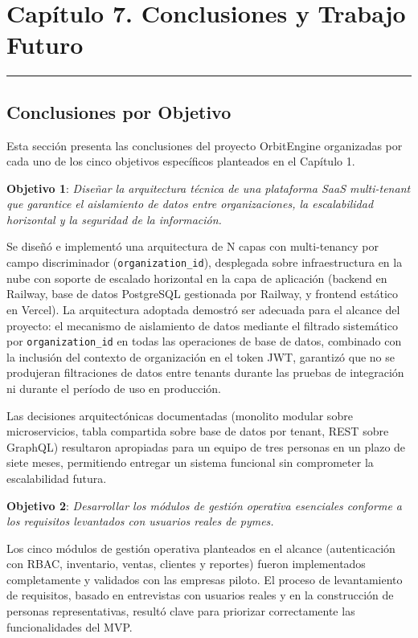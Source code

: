 \chapter{Capítulo 7. Conclusiones y Trabajo Futuro}\label{capuxedtulo-7.-conclusiones-y-trabajo-futuro}

\begin{center}\rule{0.5\linewidth}{0.5pt}\end{center}

\section{Conclusiones por Objetivo}\label{conclusiones-por-objetivo}

Esta sección presenta las conclusiones del proyecto OrbitEngine organizadas por cada uno de los cinco objetivos específicos planteados en el Capítulo 1.

\textbf{Objetivo 1}: \emph{Diseñar la arquitectura técnica de una plataforma SaaS multi-tenant que garantice el aislamiento de datos entre organizaciones, la escalabilidad horizontal y la seguridad de la información.}

Se diseñó e implementó una arquitectura de N capas con multi-tenancy por campo discriminador (\texttt{organization\_id}), desplegada sobre infraestructura en la nube con soporte de escalado horizontal en la capa de aplicación (backend en Railway, base de datos PostgreSQL gestionada por Railway, y frontend estático en Vercel). La arquitectura adoptada demostró ser adecuada para el alcance del proyecto: el mecanismo de aislamiento de datos mediante el filtrado sistemático por \texttt{organization\_id} en todas las operaciones de base de datos, combinado con la inclusión del contexto de organización en el token JWT, garantizó que no se produjeran filtraciones de datos entre tenants durante las pruebas de integración ni durante el período de uso en producción.

Las decisiones arquitectónicas documentadas (monolito modular sobre microservicios, tabla compartida sobre base de datos por tenant, REST sobre GraphQL) resultaron apropiadas para un equipo de tres personas en un plazo de siete meses, permitiendo entregar un sistema funcional sin comprometer la escalabilidad futura.

\textbf{Objetivo 2}: \emph{Desarrollar los módulos de gestión operativa esenciales conforme a los requisitos levantados con usuarios reales de pymes.}

Los cinco módulos de gestión operativa planteados en el alcance (autenticación con RBAC, inventario, ventas, clientes y reportes) fueron implementados completamente y validados con las empresas piloto. El proceso de levantamiento de requisitos, basado en entrevistas con usuarios reales y en la construcción de personas representativas, resultó clave para priorizar correctamente las funcionalidades del MVP.

